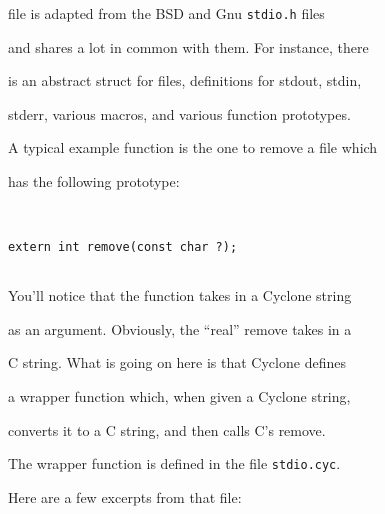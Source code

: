 file is adapted from the BSD and Gnu \texttt{stdio.h} files


and shares a lot in common with them.  For instance, there


is an abstract struct for files, definitions for stdout, stdin,


stderr, various macros, and various function prototypes.





A typical example function is the one to remove a file which


has the following prototype:


\begin{verbatim}


extern int remove(const char ?);


\end{verbatim}


You'll notice that the function takes in a Cyclone string


as an argument.  Obviously, the ``real'' remove takes in a


C string.  What is going on here is that Cyclone defines


a wrapper function which, when given a Cyclone string,


converts it to a C string, and then calls C's remove. 





The wrapper function is defined in the file \texttt{stdio.cyc}.


Here are a few excerpts from that file:


